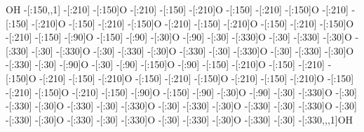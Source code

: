                OH%
     -[:150,,1]%
        -[:210]%
        -[:150]O%
        -[:210]%
        -[:150]%
        -[:210]O%
        -[:150]%
        -[:210]%
        -[:150]O%
        -[:210]%
        -[:150]%
        -[:210]O%
        -[:150]%
        -[:210]%
        -[:150]O%
        -[:210]%
        -[:150]%
        -[:210]O%
        -[:150]%
        -[:210]%
        -[:150]O%
        -[:210]%
        -[:150]%
         -[:90]O%
        -[:150]%
         -[:90]%
         -[:30]O%
         -[:90]%
         -[:30]%
        -[:330]O%
         -[:30]%
        -[:330]%
         -[:30]O%
        -[:330]%
         -[:30]%
        -[:330]O%
         -[:30]%
        -[:330]%
         -[:30]O%
        -[:330]%
         -[:30]%
        -[:330]O%
         -[:30]%
        -[:330]%
         -[:30]O%
        -[:330]%
         -[:30]%
         -[:90]O%
         -[:30]%
         -[:90]%
        -[:150]O%
         -[:90]%
        -[:150]%
        -[:210]O%
        -[:150]%
        -[:210]%
        -[:150]O%
        -[:210]%
        -[:150]%
        -[:210]O%
        -[:150]%
        -[:210]%
        -[:150]O%
        -[:210]%
        -[:150]%
        -[:210]O%
        -[:150]%
        -[:210]%
        -[:150]O%
        -[:210]%
        -[:150]%
         -[:90]O%
        -[:150]%
         -[:90]%
         -[:30]O%
         -[:90]%
         -[:30]%
        -[:330]O%
         -[:30]%
        -[:330]%
         -[:30]O%
        -[:330]%
         -[:30]%
        -[:330]O%
         -[:30]%
        -[:330]%
         -[:30]O%
        -[:330]%
         -[:30]%
        -[:330]O%
         -[:30]%
        -[:330]%
         -[:30]O%
        -[:330]%
         -[:30]%
        -[:330]O%
         -[:30]%
        -[:330]%
         -[:30]O%
        -[:330]%
         -[:30]%
    -[:330,,,1]OH%